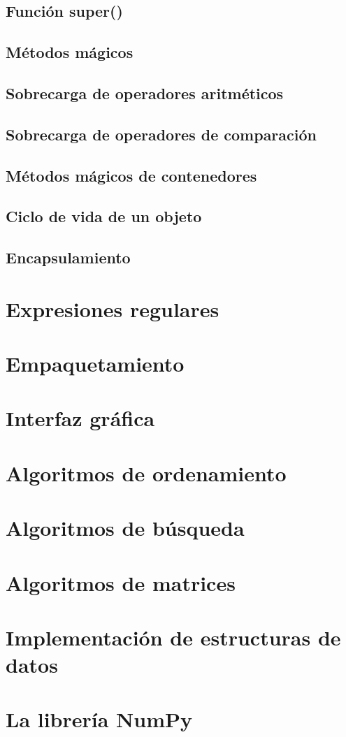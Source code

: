 \documentclass{article}
\begin{document}
\subsection{Función super()}

\subsection{Métodos mágicos}

\subsection{Sobrecarga de operadores aritméticos}

\subsection{Sobrecarga de operadores de comparación}

\subsection{Métodos mágicos de contenedores}

\subsection{Ciclo de vida de un objeto}

\subsection{Encapsulamiento}

\newpage\section{Expresiones regulares}

\newpage\section{Empaquetamiento}

\newpage\section{Interfaz gráfica}

\newpage\section{Algoritmos de ordenamiento}

\newpage\section{Algoritmos de búsqueda}

\newpage\section{Algoritmos de matrices}

\newpage\section{Implementación de estructuras de datos}

\newpage\section{La librería NumPy}
\end{document}
